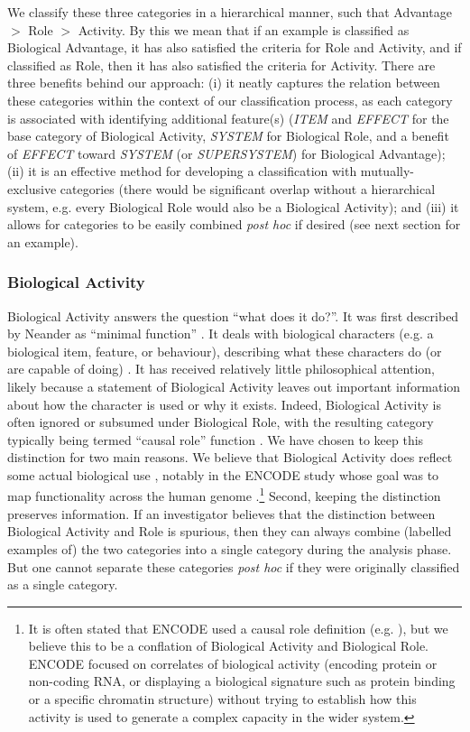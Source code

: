 \documentclass{article}
\begin{document}
We classify these three categories in a hierarchical manner, such that Advantage $>$ Role $>$ Activity.
By this we mean that if an example is classified as Biological Advantage, it has also satisfied the criteria for Role and Activity, and if classified as Role, then it has also satisfied the criteria for Activity.
There are three benefits behind our approach: (i) it neatly captures the relation between these categories within the context of our classification process, as each category is associated with identifying additional feature(s) (\emph{ITEM} and \emph{EFFECT} for the base category of Biological Activity, \emph{SYSTEM} for Biological Role, and a benefit of \emph{EFFECT} toward \emph{SYSTEM} (or \emph{SUPERSYSTEM}) for Biological Advantage); (ii) it is an effective method for developing a classification with mutually-exclusive categories (there would be significant overlap without a hierarchical system, e.g. every Biological Role would also be a Biological Activity); and (iii) it allows for categories to be easily combined \emph{post hoc} if desired (see next section for an example).

\subsubsection{Biological Activity}
\label{sec:biological-activity-1}

Biological Activity answers the question ``what does it do?''.
It was first described by Neander as ``minimal function'' \cite{neander1995}.
It deals with biological characters (e.g. a biological item, feature, or behaviour), describing what these characters do (or are capable of doing) \cite{wouters2003}.
It has received relatively little philosophical attention, likely because a statement of Biological Activity leaves out important information about how the character is used or why it exists.
Indeed, Biological Activity is often ignored or subsumed under Biological Role, with the resulting category typically being termed ``causal role'' function \cite{cummins1975}.
We have chosen to keep this distinction for two main reasons.
We believe that Biological Activity does reflect some actual biological use \cite{wouters2003}, notably in the ENCODE study whose goal was to map functionality across the human genome \cite{encode2012}.\footnote{It is often stated that ENCODE used a causal role definition (e.g. \cite{graur2013}), but we believe this to be a conflation of Biological Activity and Biological Role. ENCODE focused on correlates of biological activity (encoding protein or non-coding RNA, or displaying a biological signature such as protein binding or a specific chromatin structure) without trying to establish how this activity is used to generate a complex capacity in the wider system.}
Second, keeping the distinction preserves information.
If an investigator believes that the distinction between Biological Activity and Role is spurious, then they can always combine (labelled examples of) the two categories into a single category during the analysis phase.
But one cannot separate these categories \emph{post hoc} if they were originally classified as a single category.
\end{document}
